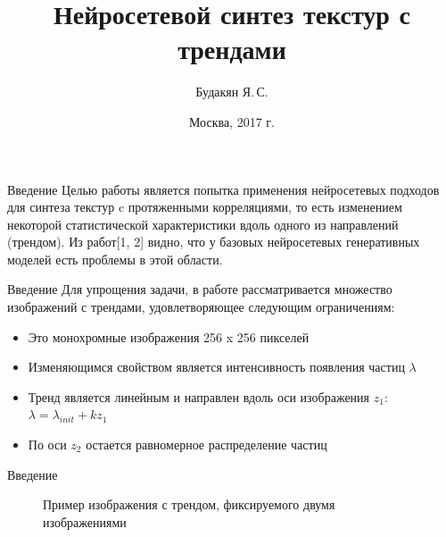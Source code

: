 \documentclass[12pt]{beamer}
\begin{document}
	\title{Нейросетевой синтез текстур с трендами}
	\author{Будакян Я.\,С.}
	\date{Москва, 2017 г.} 

	\maketitle

	\begin{frame}{Введение}
		Целью работы является попытка применения нейросетевых подходов для синтеза текстур c протяженными корреляциями, то есть изменением некоторой статистической характеристики вдоль одного из направлений (трендом). Из работ[1, 2] видно, что у базовых нейросетевых генеративных моделей есть проблемы в этой области.
	\end{frame}
	
	\begin{frame}{Введение}
		Для упрощения задачи, в работе рассматривается множество изображений с трендами, удовлетворяющее следующим ограничениям:
		
		\begin{itemize}
			\item Это монохромные изображения 256 x 256 пикселей
			\item Изменяющимся свойством является интенсивность появления частиц $\lambda$
			\item Тренд является линейным и направлен вдоль оси изображения $z_1$: 
			$ \lambda = \lambda_{init} + k z_1 $
			\item По оси $z_2$ остается равномерное распределение частиц
		\end{itemize}
	\end{frame}
	
	\begin{frame}{Введение}
		\begin{figure}[h]
			\caption{Пример изображения с трендом, фиксируемого двумя изображениями}
			\label{1-trend-example}
		\end{figure}
	\end{frame}
	
\end{document}
